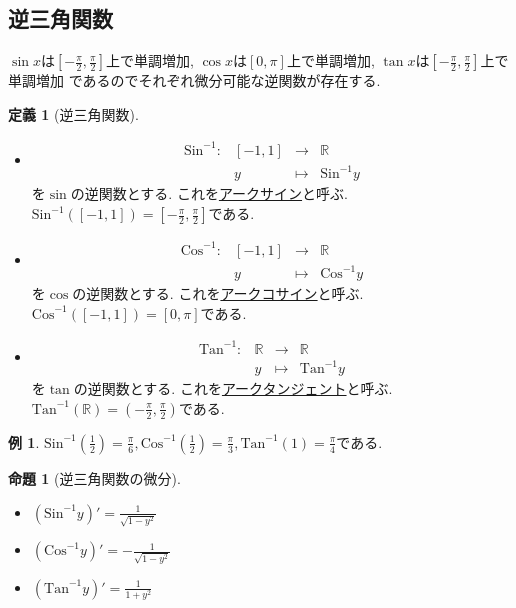 \documentclass[dvipdfmx,a4paper,11pt]{article}
\newcommand{\R}{\mathbb{R}}
\newcommand{\Sin}{\text{Sin}^{-1}}
\newcommand{\Cos}{\text{Cos}^{-1}}
\newcommand{\Tan}{\text{Tan}^{-1}}
\theoremstyle{definition}
\newtheorem{prop}[thm]{命題}
\newtheorem{dfn}[thm]{定義}
\newtheorem{exa}[thm]{例}
\begin{document}
\subsection{逆三角関数}
$\sin x$は$[- \frac{\pi}{2}, \frac{\pi}{2}]$上で単調増加, 
$\cos x$は$[0, \pi]$上で単調増加, 
$\tan x$は$[- \frac{\pi}{2}, \frac{\pi}{2}]$上で単調増加
であるのでそれぞれ微分可能な逆関数が存在する.

 \begin{tcolorbox}[
    colback = white,
    colframe = green!35!black,
    fonttitle = \bfseries,
    breakable = true]
    \begin{dfn}[逆三角関数]
    \text{}
 \begin{itemize}
 \item    $$
\begin{array}{cccc}
\Sin: &[-1,1]& \rightarrow & \R  \\
&y& \longmapsto & \Sin y
\end{array}
$$
 を$\sin$の逆関数とする. これを\underline{アークサイン}と呼ぶ.
 $\Sin([-1,1])=[- \frac{\pi}{2}, \frac{\pi}{2}]$である.
 \item    $$
\begin{array}{cccc}
\Cos: &[-1,1]& \rightarrow & \R  \\
&y& \longmapsto & \Cos y
\end{array}
$$
 を$\cos$の逆関数とする. これを\underline{アークコサイン}と呼ぶ.
 $\Cos([-1,1])=[0, \pi]$である.
  \item    $$
\begin{array}{cccc}
\Tan: &\R& \rightarrow & \R  \\
&y& \longmapsto & \Tan y
\end{array}
$$
 を$\tan$の逆関数とする. これを\underline{アークタンジェント}と呼ぶ.
 $\Tan(\R)=(- \frac{\pi}{2}, \frac{\pi}{2})$である.
 \end{itemize}
 \end{dfn}
   \end{tcolorbox}
   
\begin{exa}
$\Sin(\frac{1}{2})=\frac{\pi}{6}, \Cos(\frac{1}{2})=\frac{\pi}{3},\Tan(1)=\frac{\pi}{4}$である.
\end{exa}

 \begin{tcolorbox}[
    colback = white,
    colframe = green!35!black,
    fonttitle = \bfseries,
    breakable = true]
    \begin{prop}[逆三角関数の微分]
    \text{}
 \begin{itemize}
 \item  $(\Sin y)' =  \frac{1}{\sqrt{1-y^2}}$ 
 \item  $(\Cos y)' = - \frac{1}{\sqrt{1-y^2}}$
  \item  $(\Tan y)' = \frac{1}{1 + y^2}$
 \end{itemize}
 \end{prop}
   \end{tcolorbox}
   
\end{document}

